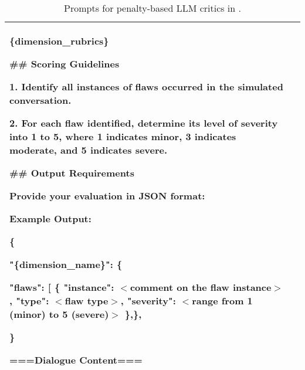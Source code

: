 \begin{table*}[h]
{\begin{tabular}{p{1in}|p{5.4in}}
\{dimension\_rubrics\}

\#\# Scoring Guidelines

1. Identify all instances of flaws occurred in the simulated conversation.
      
2. For each flaw identified, determine its level of severity into 1 to 5, where 1 indicates minor, 3 indicates moderate, and 5 indicates severe.
   
\#\# Output Requirements

Provide your evaluation in JSON format:

Example Output:

\{

    \quad "\{dimension\_name\}": \{
    
        \qquad"flaws": [ 
          \{
            "instance": $<$comment on the flaw instance$>$, 
            "type": $<$flaw type$>$, 
            "severity": $<$range from 1 (minor) to 5 (severe)$>$
          \},\},
    
\}

===Dialogue Content===

\\ 
    
\bottomrule

\end{tabular}}

\caption{Prompts for penalty-based LLM critics in \method. }
\label{tab:prompts_eval}
\end{table*}

